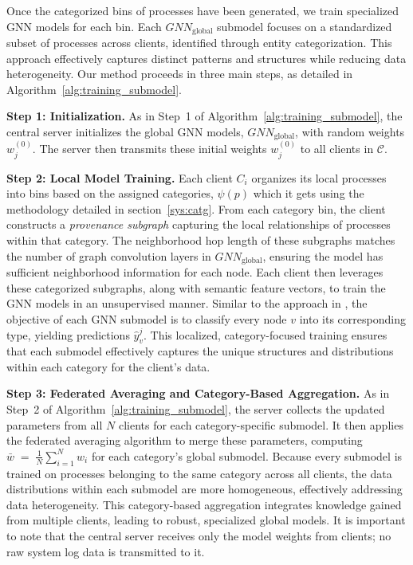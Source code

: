 
Once the categorized bins of processes have been generated, we train specialized GNN models for each bin. Each \({GNN}_{\text{global}}\) submodel focuses on a standardized subset of processes across clients, identified through entity categorization. This approach effectively captures distinct patterns and structures while reducing data heterogeneity. Our method proceeds in three main steps, as detailed in Algorithm~\ref{alg:training_submodel}.

\textbf{Step 1: Initialization.} As in Step~1 of Algorithm~\ref{alg:training_submodel}, the central server initializes the global GNN models, \({GNN}_{\text{global}}\), with random weights \( w_j^{(0)} \). The server then transmits these initial weights \( w_j^{(0)} \) to all clients in \(\mathcal{C}\).

\textbf{Step 2: Local Model Training.} Each client \( C_i \) organizes its local processes into bins based on the assigned categories, \(\psi(p)\) which it gets using the methodology detailed in section~\ref{sys:catg}. From each category bin, the client constructs a \emph{provenance subgraph} capturing the local relationships of processes within that category. The neighborhood hop length of these subgraphs matches the number of graph convolution layers in \({GNN}_{\text{global}}\), ensuring the model has sufficient neighborhood information for each node. Each client then leverages these categorized subgraphs, along with semantic feature vectors, to train the GNN models in an unsupervised manner. Similar to the approach in \flash, the objective of each GNN submodel is to classify every node \(v\) into its corresponding type, yielding predictions \(\hat{y}_v^j\). This localized, category-focused training ensures that each submodel effectively captures the unique structures and distributions within each category for the client’s data.

\textbf{Step 3: Federated Averaging and Category-Based Aggregation.} As in Step~2 of Algorithm~\ref{alg:training_submodel}, the server collects the updated parameters from all \( N \) clients for each category-specific submodel. It then applies the federated averaging algorithm to merge these parameters, computing \( \bar{w} \;=\; \frac{1}{N} \sum_{i=1}^{N} w_i \)
for each category’s global submodel. Because every submodel is trained on processes belonging to the same category across all clients, the data distributions within each submodel are more homogeneous, effectively addressing data heterogeneity. This category-based aggregation integrates knowledge gained from multiple clients, leading to robust, specialized global models. It is important to note that the central server receives only the model weights from clients; no raw system log data is transmitted to it.

